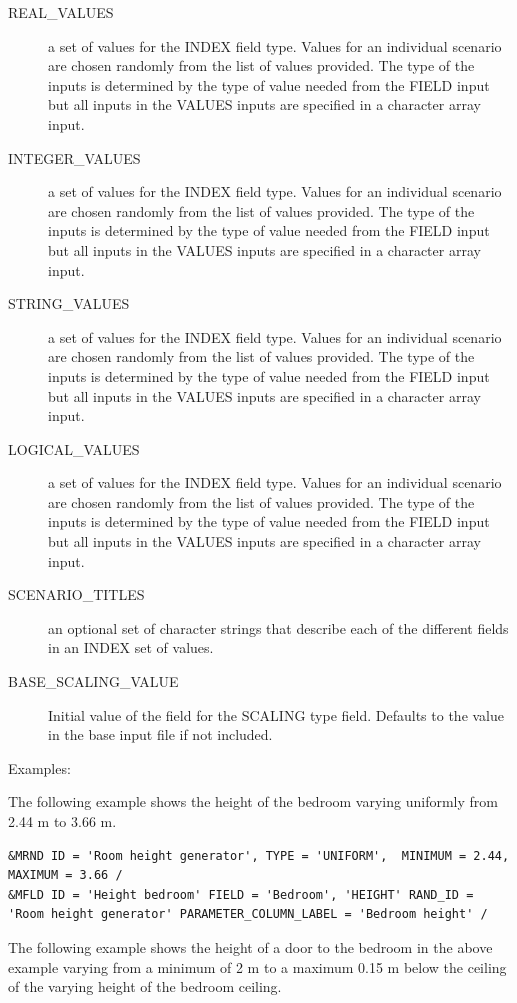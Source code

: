 \documentclass[12pt,twoside]{book}
\begin{document}
\begin{description}
  \item[REAL\_VALUES] a set of values for the {\ct INDEX} field type. Values for an individual scenario are chosen randomly from the list of values provided. The type of the inputs is determined by the type of value needed from the {\ct FIELD} input but all inputs in the {\ct VALUES} inputs are specified in a character array input.
  \item[INTEGER\_VALUES] a set of values for the {\ct INDEX} field type. Values for an individual scenario are chosen randomly from the list of values provided. The type of the inputs is determined by the type of value needed from the {\ct FIELD} input but all inputs in the {\ct VALUES} inputs are specified in a character array input.
  \item[STRING\_VALUES] a set of values for the {\ct INDEX} field type. Values for an individual scenario are chosen randomly from the list of values provided. The type of the inputs is determined by the type of value needed from the {\ct FIELD} input but all inputs in the {\ct VALUES} inputs are specified in a character array input.
  \item[LOGICAL\_VALUES] a set of values for the {\ct INDEX} field type. Values for an individual scenario are chosen randomly from the list of values provided. The type of the inputs is determined by the type of value needed from the {\ct FIELD} input but all inputs in the {\ct VALUES} inputs are specified in a character array input.
  \item[SCENARIO\_TITLES] an optional set of character strings that describe each of the different fields in an {\ct INDEX} set of values.
  \item[BASE\_SCALING\_VALUE] Initial value of the field for the {\ct SCALING} type field. Defaults to the value in the base input file if not included.
\end{description}

\vspace{\baselineskip}
\noindent Examples:

The following example shows the height of the bedroom varying uniformly from 2.44 m to 3.66 m.
\begin{lstlisting}[basicstyle=\scriptsize]
&MRND ID = 'Room height generator', TYPE = 'UNIFORM',  MINIMUM = 2.44, MAXIMUM = 3.66 /
&MFLD ID = 'Height bedroom' FIELD = 'Bedroom', 'HEIGHT' RAND_ID = 'Room height generator' PARAMETER_COLUMN_LABEL = 'Bedroom height' /
\end{lstlisting}

The following example shows the height of a door to the bedroom in the above example varying from a minimum of 2 m to a maximum 0.15 m below the ceiling of the varying height of the bedroom ceiling.
\end{document}
